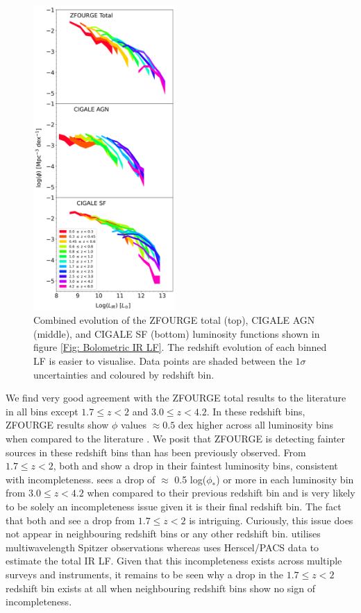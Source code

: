 \begin{figure}
    \centering
    \includegraphics[width=0.48\textwidth]{Figures/LF Filled.png}
    \caption{Combined evolution of the ZFOURGE total (top), CIGALE AGN (middle), and CIGALE SF (bottom) luminosity functions shown in figure \ref{Fig: Bolometric IR LF}. The redshift evolution of each binned LF is easier to visualise. Data points are shaded between the $1\sigma$ uncertainties and coloured by redshift bin.}
    \label{Fig: LF Filled}
\end{figure}

We find very good agreement with the ZFOURGE total results to the literature in all bins except $1.7 \leq z < 2$ and $3.0 \leq z < 4.2$. In these redshift bins, ZFOURGE results show $\phi$ values $\approx 0.5$ dex higher across all luminosity bins when compared to the literature \citep{gruppioni_herschel_2013, rodighiero_mid-_2010}. We posit that ZFOURGE is detecting fainter sources in these redshift bins than has been previously observed. From $1.7 \leq z < 2$, both \cite{rodighiero_mid-_2010} and \cite{gruppioni_herschel_2013} show a drop in their faintest luminosity bins, consistent with incompleteness. \cite{gruppioni_herschel_2013} sees a drop of $\approx$ 0.5 log($\phi_{*}$) or more in each luminosity bin from $3.0 \leq z < 4.2$ when compared to their previous redshift bin and is very likely to be solely an incompleteness issue given it is their final redshift bin. The fact that both \cite{gruppioni_herschel_2013} and \cite{rodighiero_mid-_2010} see a drop from $1.7 \leq z < 2$ is intriguing. Curiously, this issue does not appear in neighbouring redshift bins or any other redshift bin. \cite{rodighiero_mid-_2010} utilises multiwavelength Spitzer observations whereas \cite{gruppioni_herschel_2013} uses Herscel/PACS data to estimate the total IR LF. Given that this incompleteness exists across multiple surveys and instruments, it remains to be seen why a drop in the $1.7 \leq z < 2$ redshift bin exists at all when neighbouring redshift bins show no sign of incompleteness.


